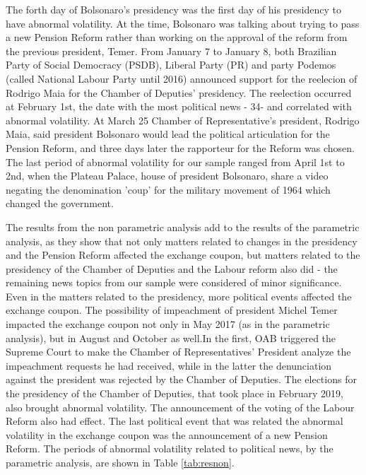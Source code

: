 \documentclass[cic,tc, english]{iiufrgs}
\begin{document}
    The forth day of Bolsonaro's presidency was the first day of his presidency to have abnormal volatility. At the time, Bolsonaro was talking about trying to pass a new Pension Reform rather than working on the approval of the reform from the previous president, Temer. From January 7 to January 8, both Brazilian Party of Social Democracy (PSDB), Liberal Party (PR) and party Podemos (called National Labour Party until 2016) announced support for the reelecion of Rodrigo Maia for the Chamber of Deputies' presidency. The reelection occurred at February 1st, the date with the most political news - 34- and correlated with abnormal volatility. At March 25 Chamber of Representative's president, Rodrigo Maia, said president Bolsonaro would lead the political articulation for the Pension Reform, and three days later the rapporteur for the Reform was chosen. The last period of abnormal volatility for our sample ranged from April 1st to 2nd, when the Plateau Palace, house of president Bolsonaro, share a video negating the denomination 'coup' for the military movement of 1964 which changed the government.

    The results from the non parametric analysis add to the results of the parametric analysis, as they show that not only matters related to changes in the presidency and the Pension Reform affected the exchange coupon, but matters related to the presidency of the Chamber of Deputies and the Labour reform also did - the remaining news topics from our sample were considered of minor significance. Even in the matters related to the presidency, more political events affected the exchange coupon. The possibility of impeachment of president Michel Temer impacted the exchange coupon not only in May 2017 (as in the parametric analysis), but in August and October as well.In the first, OAB triggered the Supreme Court to make the Chamber of Representatives' President analyze the impeachment requests he had received, while in the latter the denunciation against the president was rejected by the Chamber of Deputies. The elections for the presidency of the Chamber of Deputies, that took place in February 2019, also brought abnormal volatility. The announcement of the voting of the Labour Reform also had effect. The last political event that was related the abnormal volatility in the exchange coupon was the announcement of a new Pension Reform. The periods of abnormal volatility related to political news, by the parametric analysis, are shown in Table \ref{tab:resnon}.
\end{document}
